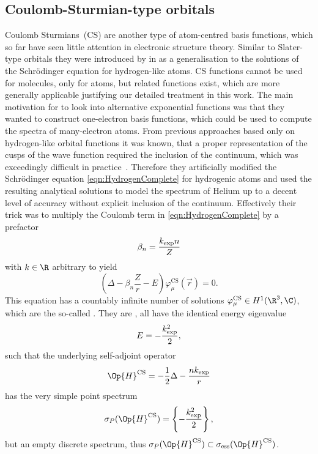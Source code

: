 \subsection{Coulomb-Sturmian-type orbitals}
\label{sec:BasisCS}
Coulomb Sturmians~(CS) are another type of atom-centred basis functions,
which so far have seen little attention in electronic structure theory.
Similar to Slater-type orbitals
they were introduced by \citet{Shull1959} in \citeyear{Shull1959}
as a generalisation to the solutions of the Schrödinger equation for hydrogen-like atoms.
CS functions cannot be used for molecules, only for atoms,
but related functions exist,
which are more generally applicable
justifying our detailed treatment in this work.
The main motivation for \citet{Shull1959} to look into alternative
exponential functions was that they wanted to construct one-electron basis functions,
which could be used to compute the spectra of many-electron atoms.
From previous approaches based only on hydrogen-like orbital functions it was known,
that a proper representation of the cusps of the wave function
required the inclusion of the continuum,
which was exceedingly difficult in practice~\cite{Avery2006}.
Therefore they artificially modified the Schrödinger equation \eqref{eqn:HydrogenComplete}
for hydrogenic atoms and used the resulting analytical solutions
to model the spectrum of Helium up to a decent level of accuracy
without explicit inclusion of the continuum.
Effectively their trick was to multiply the Coulomb term
in \eqref{eqn:HydrogenComplete} by a prefactor
\begin{equation}
	\beta_n = \frac{k_\text{exp} n}{Z}
	\label{eqn:CSbeta}
\end{equation}
with $k \in \R$ arbitrary to yield
\begin{equation}
	\left( \Delta - \beta_n \frac{Z}{r} - E \right) \varphi^\text{CS}_\mu(\vec{r}) = 0.
	\label{eqn:CS}
\end{equation}
This equation has a countably infinite number of solutions
$\varphi^\text{CS}_\mu \in H^1(\R^3, \C)$,
which are the so-called .
They are ,
\ie all have the identical energy eigenvalue
\begin{equation}
	E = -\frac{k_\text{exp}^2}{2},
	\label{eqn:CSenergy}
\end{equation}
such that the underlying self-adjoint operator
\[ \Op{H}^\text{CS} = - \frac12 \Delta - \frac{n\kexp}{r} \]
has the very simple point spectrum
\[ \sigma_P(\Op{H}^\text{CS}) = \left\{ -\frac{\kexp^2}{2} \right\}, \]
but an empty discrete spectrum,
thus $\sigma_P(\Op{H}^\text{CS}) \subset \sigma_\text{ess}(\Op{H}^\text{CS})$.

